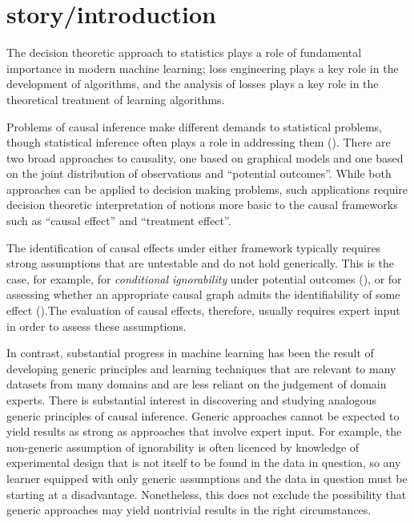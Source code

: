 \section{story/introduction}

The decision theoretic approach to statistics plays a role of fundamental importance in modern machine learning; loss engineering plays a key role in the development of algorithms, and the analysis of losses plays a key role in the theoretical treatment of learning algorithms.

Problems of causal inference make different demands to statistical problems, though statistical inference often plays a role in addressing them (\cite{pearl_causality:_2009}). There are two broad approaches to causality, one based on graphical models and one based on the joint distribution of observations and ``potential outcomes''. While both approaches can be applied to decision making problems, such applications require decision theoretic interpretation of notions more basic to the causal frameworks such as ``causal effect'' and ``treatment effect''.

The identification of causal effects under either framework typically requires strong assumptions that are untestable and do not hold generically. This is the case, for example, for \emph{conditional ignorability} under potential outcomes (\cite{gordon_comparison_2018, heckman_randomization_1991}), or for assessing whether an appropriate causal graph admits the identifiability of some effect (\cite{tian2002general}).The evaluation of causal effects, therefore, usually requires expert input in order to assess these assumptions. 

In contrast, substantial progress in machine learning has been the result of developing generic principles and learning techniques that are relevant to many datasets from many domains and are less reliant on the judgement of domain experts. There is substantial interest in discovering and studying analogous generic principles of causal inference. Generic approaches cannot be expected to yield results as strong as approaches that involve expert input. For example, the non-generic assumption of ignorability is often licenced by knowledge of experimental design that is not itself to be found in the data in question, so any learner equipped with only generic assumptions and the data in question must be starting at a disadvantage. Nonetheless, this does not exclude the possibility that generic approaches may yield nontrivial results in the right circumstances.

